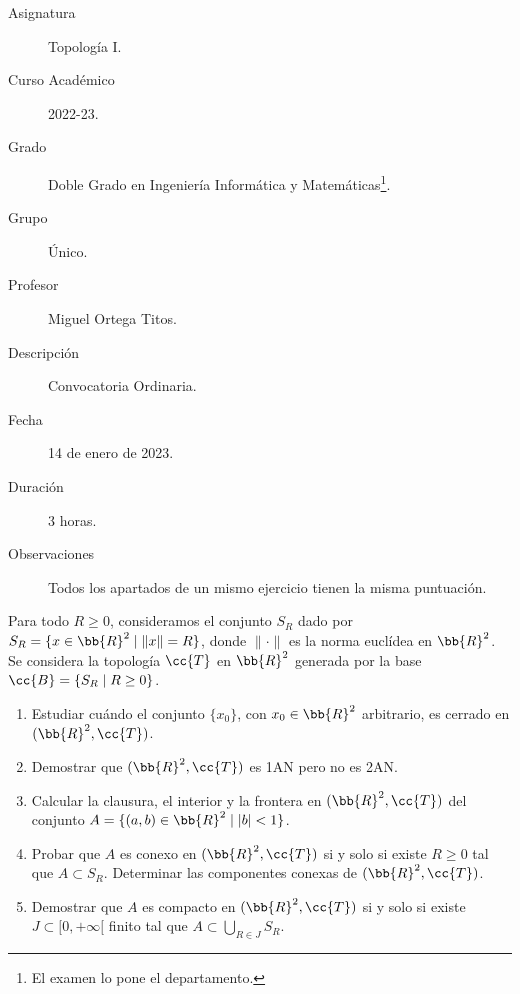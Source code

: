 \documentclass[12pt]{article}
\newcommand{\T}[0]{\cc{T}}
\begin{document}

    
    

    \begin{description}
        \item[Asignatura] Topología I.
        \item[Curso Académico] 2022-23.
        \item[Grado] Doble Grado en Ingeniería Informática y Matemáticas\footnote{El examen lo pone el departamento.}.
        \item[Grupo] Único.
        \item[Profesor] Miguel Ortega Titos.
        \item[Descripción] Convocatoria Ordinaria.
        \item[Fecha] 14 de enero de 2023.
        \item[Duración] 3 horas.
        \item[Observaciones] Todos los apartados de un mismo ejercicio tienen la misma puntuación.
    
    \end{description}
    \newpage
    
    \begin{ejercicio}[4.5 puntos]
        Para todo $R\geq 0$, consideramos el conjunto $S_R$ dado por $S_R= \{x\in \bb{R}^2\mid \|x\|= R\}$, donde $\|\cdot\|$ es la norma euclídea en $\bb{R}^2$.
        Se considera la topología $\T$ en $\bb{R}^2$ generada por la base $\cc{B}= \{S_R\mid R\geq 0\}$.
        \begin{enumerate}
            \item Estudiar cuándo el conjunto $\{x_0\}$, con $x_0\in \bb{R}^2$ arbitrario, es cerrado en $(\bb{R}^2,\T)$.
            \item Demostrar que $(\bb{R}^2,\T)$ es 1AN pero no es 2AN.
            \item Calcular la clausura, el interior y la frontera en $(\bb{R}^2,\T)$ del conjunto $A=\{(a,b)\in \bb{R}^2\mid |b|<1\}$.
            \item Probar que $A$ es conexo en $(\bb{R}^2,\T)$ si y solo si existe $R\geq 0$ tal que $A\subset S_R$. Determinar
            las componentes conexas de $(\bb{R}^2,\T)$.
            \item Demostrar que $A$ es compacto en $(\bb{R}^2,\T)$ si y solo si existe $J\subset [0,+\infty[$ finito tal que
            $A\subset \bigcup\limits_{R\in J}S_R$.
        \end{enumerate}
    \end{ejercicio}
\end{document}
